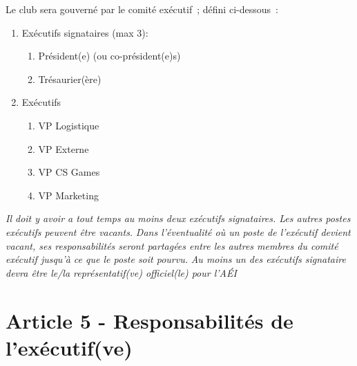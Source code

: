 %
Le club sera gouverné par le comité exécutif~; défini ci-dessous~:
\begin{enumerate}
    \item Exécutifs signataires (max 3):
    \begin{enumerate}
        \item Président(e) (ou co-président(e)s)
        \item Trésaurier(ère)
    \end{enumerate}
    \item Exécutifs 
    \begin{enumerate}
        \item VP Logistique
        \item VP Externe
        \item VP CS Games
        \item VP Marketing
    \end{enumerate}
\end{enumerate}

\textit{Il doit y avoir a tout temps au moins deux exécutifs signataires. Les autres postes exécutifs peuvent être vacants.}
\textit{Dans l'éventualité où un poste de l'exécutif devient vacant, ses responsabilités seront partagées entre les autres membres du comité exécutif jusqu'à ce que le poste soit pourvu.}
\textit{Au moins un des exécutifs signataire devra être le/la représentatif(ve) officiel(le) pour l'AÉI }

\section*{Article 5 - Responsabilités de l'exécutif(ve)}


